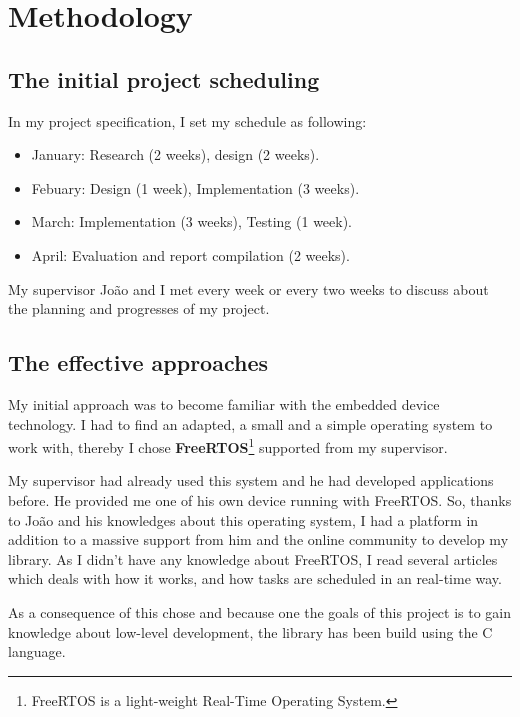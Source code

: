 \chapter{Methodology}

\section{The initial project scheduling}

\hspace{15mm}In my project specification, I set my schedule as following:
\begin{itemize}
\item January: Research (2 weeks), design (2 weeks).
\item Febuary: Design (1 week), Implementation (3 weeks).
\item March: Implementation (3 weeks), Testing (1 week).
\item April: Evaluation and report compilation (2 weeks).
\end{itemize}

My supervisor Jo\~{a}o and I met every week or every two weeks to discuss about the planning and progresses of my project. 


\section{The effective approaches}

\hspace{15mm}My initial approach was to become familiar with the embedded device technology. I had to find an adapted, a small and a simple operating system to work with, thereby I chose \textbf{FreeRTOS}\footnote{FreeRTOS is a light-weight Real-Time Operating System.} supported from my supervisor.

My supervisor had already used this system and he had developed applications before. He provided me one of his own device running with FreeRTOS. So, thanks to Jo\~{a}o and his knowledges about this operating system, I had a platform in addition to a massive support from him and the online community to develop my library. As I didn't have any knowledge about FreeRTOS, I read several articles which deals with how it works, and how tasks are scheduled in an real-time way.

As a consequence of this chose and because one the goals of this project is to gain knowledge about low-level development, the library has been build using the C language.

